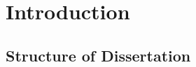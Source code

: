\chapter[Introduction]{Introduction}
\label{ch:intro}



\section{Structure of Dissertation}




















